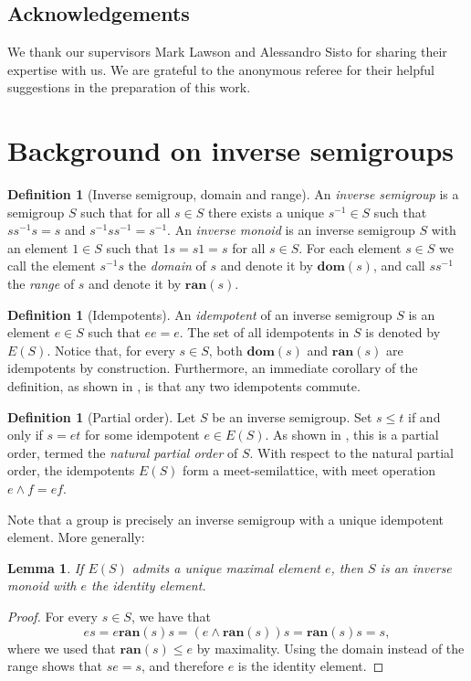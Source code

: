 \documentclass[svgnames]{amsart}
\theoremstyle{plain}
\newtheorem{lem}[thm]{Lemma}
\theoremstyle{definition}
\newtheorem{defn}[thm]{Definition}
\newcommand{\dom}[1]{\mathbf{dom}\left(#1\right)}
\newcommand{\ran}[1]{\mathbf{ran}\left(#1\right)}
\begin{document}
\subsection*{Acknowledgements}
We thank our supervisors Mark Lawson and Alessandro Sisto for sharing their expertise with us. We are grateful to the anonymous referee for their helpful suggestions in the preparation of this work.

\section{Background on inverse semigroups}\label{sec:background}

\begin{defn}[Inverse semigroup, domain and range]
An \emph{inverse semigroup} is a semigroup $S$ such that for all $s \in S$ there exists a unique $s^{-1} \in S$ such that $ss^{-1}s = s$ and $s^{-1}ss^{-1} = s^{-1}$. An \emph{inverse monoid} is an inverse semigroup $S$ with an element $1 \in S$ such that $1s= s1= s$ for all $s \in S$. For each element $s \in S$ we call the element $s^{-1}s$ the \emph{domain} of $s$ and denote it by $\dom{s}$, and call $ss^{-1} $ the \emph{range} of $s$ and denote it by $\ran{s}$.
\end{defn}

\begin{defn}[Idempotents]
	An \emph{idempotent} of an inverse semigroup $S$ is an element $e \in S$ such that $ee=e$. The set of all idempotents in $S$ is denoted by $E(S)$. Notice that, for every $s\in S$, both $\dom{s}$ and $\ran{s}$ are idempotents by construction. Furthermore, an immediate corollary of the definition, as shown in \cite{LawsonBook}, is that any two idempotents commute.
\end{defn}





\begin{defn}[Partial order]
	Let $S$ be an inverse semigroup. Set $s \leq t$ if
    and only if $s = et$ for some idempotent $e \in E(S)$. As
    shown in \cite{LawsonBook}, this is a partial order, termed the \emph{natural partial order} of $S$.
    With respect to the natural partial order, the idempotents $E(S)$
    form a meet-semilattice, with meet operation $e\wedge f=ef$.
\end{defn}


\noindent Note that a group is precisely an inverse semigroup with a unique idempotent element. More generally:
\begin{lem}\label{lem:unique_max_implies_monoid}
    If $E(S)$ admits a unique maximal element $e$, then $S$ is an inverse monoid with $e$ the identity element.
\end{lem}
\begin{proof}
    For every $s\in S$, we have that
    \[es=e\ran{s}s=(e\wedge \ran{s})s=\ran{s}s=s,\]
    where we used that $\ran{s}\le e$ by maximality. Using the domain instead of the range shows that $se=s$, and therefore $e$ is the identity element.
\end{proof}
\end{document}
